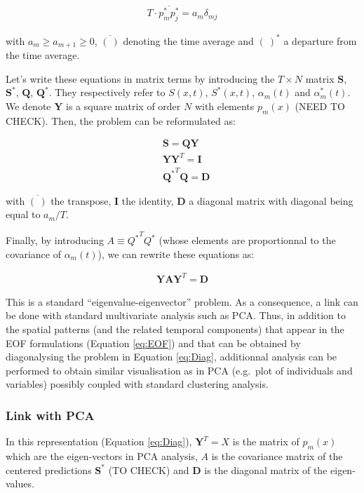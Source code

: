 \documentclass[
  man]{apa6}
\begin{document}
\begin{align}
\label{eq:Orthog2}
T \cdot \overline{p_m^* p_j^*} = a_m \delta_{mj}
\end{align}

with \(a_m \geq a_{m+1} \geq 0\), \(\overline{( \ )}\) denoting the time average and \(( \ )^*\) a departure from the time average.

Let's write these equations in matrix terms by introducing the \(T \times N\) matrix \(\mathbf{S}\), \(\mathbf{S}^*\), \(\mathbf{Q}\), \(\mathbf{Q}^*\). They respectively refer to \(S(x,t)\), \(S^*(x,t)\), \(\alpha_m(t)\) and \(\alpha_m^*(t)\). We denote \(\mathbf{Y}\) is a square matrix of order \(N\) with elements \(p_{m}(x)\) (NEED TO CHECK). Then, the problem can be reformulated as:

\begin{align}
& \mathbf{S}=\mathbf{QY} \\
& \mathbf{YY}^T=\mathbf{I} \\
& {\mathbf{Q}^{*}}^T\mathbf{Q} = \mathbf{D}
\end{align}

with \(\overline{(\ )}\) the transpose, \(\mathbf{I}\) the identity, \(\mathbf{D}\) a diagonal matrix with diagonal being equal to \(a_m / T\).

Finally, by introducing \(A \equiv {Q^*}^T Q^*\) (whose elements are proportionnal to the covariance of \(\alpha_m(t)\)), we can rewrite these equations as:

\begin{align}
\label{eq:Diag}
\mathbf{YAY}^T=\mathbf{D}
\end{align}

This is a standard ``eigenvalue-eigenvector'' problem. As a consequence, a link can be done with standard multivariate analysis such as PCA. Thus, in addition to the spatial patterns (and the related temporal components) that appear in the EOF formulations (Equation \ref{eq:EOF}) and that can be obtained by diagonalysing the problem in Equation \ref{eq:Diag}, additionnal analysis can be performed to obtain similar visualisation as in PCA (e.g.~plot of individuals and variables) possibly coupled with standard clustering analysis.

\hypertarget{link-with-pca}{%
\subsubsection{Link with PCA}\label{link-with-pca}}

In this representation (Equation \ref{eq:Diag}), \(\mathbf{Y}^T=X\) is the matrix of \(p_{m}(x)\) which are the eigen-vectors in PCA analysis, \(A\) is the covariance matrix of the centered predictions \(\mathbf{S}^*\) (TO CHECK) and \(\mathbf{D}\) is the diagonal matrix of the eigen-values.
\end{document}
